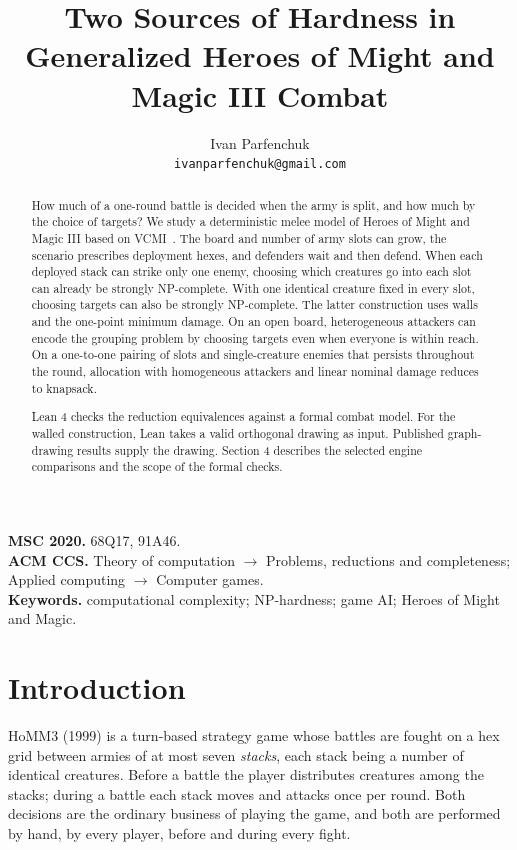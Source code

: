 \documentclass[11pt,a4paper]{article}
\title{Two Sources of Hardness in \\ Generalized Heroes of Might and Magic III Combat}
\author{Ivan Parfenchuk \\ \texttt{ivanparfenchuk@gmail.com}}
\date{}
\theoremstyle{plain}
\theoremstyle{definition}
\theoremstyle{plain}
\theoremstyle{definition}
\theoremstyle{remark}
\begin{document}
\maketitle

\begin{abstract}
How much of a one-round battle is decided when the army is split, and how much by the choice of targets? We study a deterministic melee model of Heroes of Might and Magic III based on VCMI~\cite{VCMI26}. The board and number of army slots can grow, the scenario prescribes deployment hexes, and defenders wait and then defend. When each deployed stack can strike only one enemy, choosing which creatures go into each slot can already be strongly NP-complete. With one identical creature fixed in every slot, choosing targets can also be strongly NP-complete. The latter construction uses walls and the one-point minimum damage. On an open board, heterogeneous attackers can encode the grouping problem by choosing targets even when everyone is within reach. On a one-to-one pairing of slots and single-creature enemies that persists throughout the round, allocation with homogeneous attackers and linear nominal damage reduces to knapsack.

Lean 4 checks the reduction equivalences against a formal combat model. For the walled construction, Lean takes a valid orthogonal drawing as input. Published graph-drawing results supply the drawing. Section 4 describes the selected engine comparisons and the scope of the formal checks.
\end{abstract}

\begingroup\small
\noindent\textbf{MSC 2020.} 68Q17, 91A46.\\
\noindent\textbf{ACM CCS.} Theory of computation $\rightarrow$ Problems, reductions and
completeness; Applied computing $\rightarrow$ Computer games.\\
\noindent\textbf{Keywords.} computational complexity; NP-hardness; game AI; Heroes of Might
and Magic.
\endgroup

\section{Introduction}\label{sec:intro}

HoMM3 (1999) is a turn-based strategy game whose battles are fought on a hex grid between
armies of at most seven \emph{stacks}, each stack being a number of identical creatures.
Before a battle the player distributes creatures among the stacks; during a battle each stack
moves and attacks once per round. Both decisions are the ordinary business of playing the
game, and both are performed by hand, by every player, before and during every fight.
\end{document}
